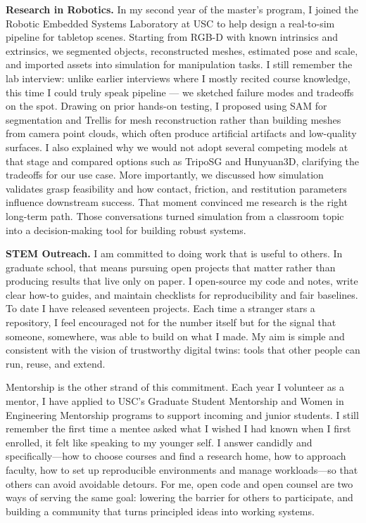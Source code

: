 \documentclass[11pt]{article}
\begin{document}
\textbf{Research in Robotics.}
In my second year of the master's program, I joined the Robotic Embedded
Systems Laboratory at USC to help design a real-to-sim pipeline for tabletop
scenes. Starting from RGB-D with known intrinsics and extrinsics, we segmented
objects, reconstructed meshes, estimated pose and scale, and imported assets
into simulation for manipulation tasks. I still remember the lab interview:
unlike earlier interviews where I mostly recited course knowledge, this time I
could truly speak pipeline --- we sketched failure modes and tradeoffs on the
spot. Drawing on prior hands-on testing, I proposed using SAM for segmentation
and Trellis for mesh reconstruction rather than building meshes from camera
point clouds, which often produce artificial artifacts and low-quality surfaces.
I also explained why we would not adopt several competing models at that stage
and compared options such as TripoSG and Hunyuan3D, clarifying the tradeoffs for
our use case. More importantly, we discussed how simulation validates grasp
feasibility and how contact, friction, and restitution parameters influence
downstream success. That moment convinced me research is the right long-term
path. Those conversations turned simulation from a classroom topic into a
decision-making tool for building robust systems.

\textbf{STEM Outreach.} 
I am committed to doing work that is useful to others. In graduate school, that
means pursuing open projects that matter rather than producing results that live
only on paper. I open-source my code and notes, write clear how-to guides, and
maintain checklists for reproducibility and fair baselines. To date I have
released seventeen projects. Each time a stranger stars a repository, I feel
encouraged not for the number itself but for the signal that someone, somewhere,
was able to build on what I made. My aim is simple and consistent with the
vision of trustworthy digital twins: tools that other people can run, reuse, and
extend.

Mentorship is the other strand of this commitment. Each year I volunteer as a
mentor, I have applied to USC's Graduate Student Mentorship and
Women in Engineering Mentorship programs to support incoming and junior students.
I still remember the first time a mentee asked what I wished I had known when I first enrolled,
it felt like speaking to my younger self. I answer candidly and
specifically---how to choose courses and find a research home, how to approach
faculty, how to set up reproducible environments and manage workloads---so that
others can avoid avoidable detours. For me, open code and open counsel are two
ways of serving the same goal: lowering the barrier for others to participate,
and building a community that turns principled ideas into working systems.
\end{document}

